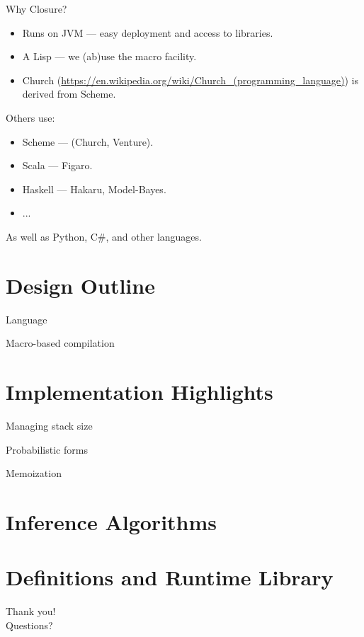 \documentclass{beamer}
\begin{document}
\begin{frame}{Why Closure?}
\begin{itemize}
    \item Runs on JVM --- easy deployment and access to libraries.
        \pause
    \item A Lisp --- we (ab)use the macro facility.
        \pause
    \item Church (\url{https://en.wikipedia.org/wiki/Church_(programming_language)}) is derived from Scheme.
\end{itemize}
\pause
Others use:
    \begin{itemize}
        \item Scheme --- (Church, Venture).
        \item Scala --- Figaro.
        \item Haskell --- Hakaru, Model-Bayes.
        \item ...
    \end{itemize}
    \pause
    As well as Python, C\#,  and other languages.
\end{frame}

\section{Design Outline}

\begin{frame}{Language}
\end{frame}

\begin{frame}{Macro-based compilation}
\end{frame}

\section{Implementation Highlights}

\begin{frame}{Managing stack size}
\end{frame}

\begin{frame}{Probabilistic forms}
\end{frame}

\begin{frame}{Memoization}
\end{frame}

\section{Inference Algorithms}

\section{Definitions and Runtime Library}

\begin{frame}
    \LARGE
    \center
    Thank you!\\Questions?
\end{frame}
\end{document}
